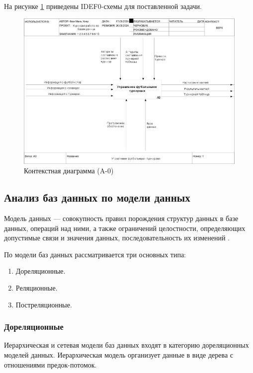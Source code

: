 На рисунке \ref{img:A0} приведены IDEF0-схемы для поставленной задачи.
\begin{figure}[h]
	\centering
	\includegraphics[height=0.45\textheight]{img/idef0/01_A0.png}
	\caption{Контекстная диаграмма (A-0)}
	\label{img:A0}
\end{figure}

\subsection{Анализ баз данных по модели данных}
Модель данных --- совокупность правил порождения структур данных в базе данных, операций над ними, а также ограничений целостности, определяющих допустимые связи и значения данных, последовательность их изменений \cite{roders}.

По модели баз данных рассматривается три основных типа:
\begin{enumerate}[left=36pt]
	\item Дореляционные.
	\item Реляционные.
	\item Постреляционные.
\end{enumerate}
\subsubsection{Дореляционные}
Иерархическая и сетевая модели баз данных входят в категорию дореляционных моделей данных.
Иерархическая модель организует данные в виде дерева с отношениями предок-потомок.

